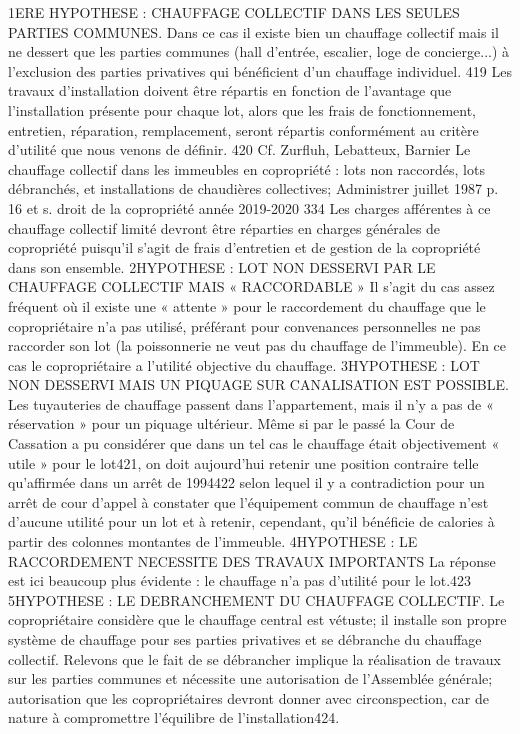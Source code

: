		1ERE HYPOTHESE : CHAUFFAGE COLLECTIF DANS LES SEULES PARTIES COMMUNES.
		Dans ce cas il existe bien un chauffage collectif mais il ne dessert que les parties communes (hall d’entrée, escalier, loge de concierge...) à l’exclusion des parties privatives qui bénéficient d’un chauffage individuel.
		419 Les travaux d’installation doivent être répartis en fonction de l’avantage que l’installation présente pour chaque lot, alors que les frais de fonctionnement, entretien, réparation, remplacement, seront répartis conformément au critère d’utilité que nous venons de définir.
		420 Cf. Zurfluh, Lebatteux, Barnier Le chauffage collectif dans les immeubles en copropriété : lots non raccordés, lots débranchés, et installations de chaudières collectives; Administrer juillet 1987 p. 16 et s.
		droit de la copropriété année 2019-2020
		334
		Les charges afférentes à ce chauffage collectif limité devront être réparties en charges générales de copropriété puisqu’il s’agit de frais d’entretien et de gestion de la copropriété dans son ensemble.
		2\degres HYPOTHESE : LOT NON DESSERVI PAR LE CHAUFFAGE COLLECTIF MAIS « RACCORDABLE »
		Il s’agit du cas assez fréquent où il existe une « attente » pour le raccordement du chauffage que le copropriétaire n’a pas utilisé, préférant pour convenances personnelles ne pas raccorder son lot (la poissonnerie ne veut pas du chauffage de l’immeuble). En ce cas le copropriétaire a l’utilité objective du chauffage.
		3\degres HYPOTHESE : LOT NON DESSERVI MAIS UN PIQUAGE SUR CANALISATION EST POSSIBLE.
		Les tuyauteries de chauffage passent dans l’appartement, mais il n’y a pas de « réservation » pour un piquage ultérieur. Même si par le passé la Cour de Cassation a pu considérer que dans un tel cas le chauffage était objectivement « utile » pour le lot421, on doit aujourd’hui retenir une position contraire telle qu’affirmée dans un arrêt de 1994422 selon lequel il y a contradiction pour un arrêt de cour d’appel à constater que l’équipement commun de chauffage n’est d’aucune utilité pour un lot et à retenir, cependant, qu’il bénéficie de calories à partir des colonnes montantes de l’immeuble.
		4\degres HYPOTHESE : LE RACCORDEMENT NECESSITE DES TRAVAUX IMPORTANTS
		La réponse est ici beaucoup plus évidente : le chauffage n’a pas d’utilité pour le lot.423
		5\degres HYPOTHESE : LE DEBRANCHEMENT DU CHAUFFAGE COLLECTIF.
		Le copropriétaire considère que le chauffage central est vétuste; il installe son propre système de chauffage pour ses parties privatives et se débranche du chauffage collectif.
		Relevons que le fait de se débrancher implique la réalisation de travaux sur les parties communes et nécessite une autorisation de l’Assemblée générale; autorisation que les copropriétaires devront donner avec circonspection, car de nature à compromettre l’équilibre de l’installation424.
